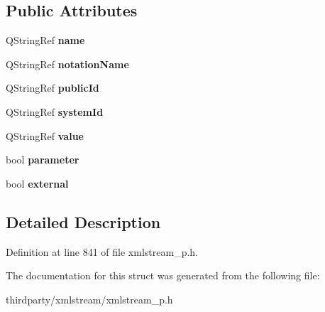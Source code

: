 \subsection*{Public Attributes}
\begin{DoxyCompactItemize}
\item 
\mbox{\label{struct_xml_stream_reader_private_1_1_entity_declaration_a19ecf0c887461ba8d6d52e5cb7a05666}} 
Q\+String\+Ref {\bfseries name}
\item 
\mbox{\label{struct_xml_stream_reader_private_1_1_entity_declaration_a4cf894555ca7b613a9a351d6c778bf09}} 
Q\+String\+Ref {\bfseries notation\+Name}
\item 
\mbox{\label{struct_xml_stream_reader_private_1_1_entity_declaration_af745601a74da79e8671821e59830e225}} 
Q\+String\+Ref {\bfseries public\+Id}
\item 
\mbox{\label{struct_xml_stream_reader_private_1_1_entity_declaration_acb090147321c26d12e339fac5ad6da89}} 
Q\+String\+Ref {\bfseries system\+Id}
\item 
\mbox{\label{struct_xml_stream_reader_private_1_1_entity_declaration_a164ad56f30cb16fdad79bdcd7a4fe411}} 
Q\+String\+Ref {\bfseries value}
\item 
\mbox{\label{struct_xml_stream_reader_private_1_1_entity_declaration_a68c47a0ab63ef03a9c3d45b2cc6060f8}} 
bool {\bfseries parameter}
\item 
\mbox{\label{struct_xml_stream_reader_private_1_1_entity_declaration_a9924748afcb305908076e174448145f2}} 
bool {\bfseries external}
\end{DoxyCompactItemize}


\subsection{Detailed Description}


Definition at line 841 of file xmlstream\+\_\+p.\+h.



The documentation for this struct was generated from the following file\+:\begin{DoxyCompactItemize}
\item 
thirdparty/xmlstream/xmlstream\+\_\+p.\+h\end{DoxyCompactItemize}

